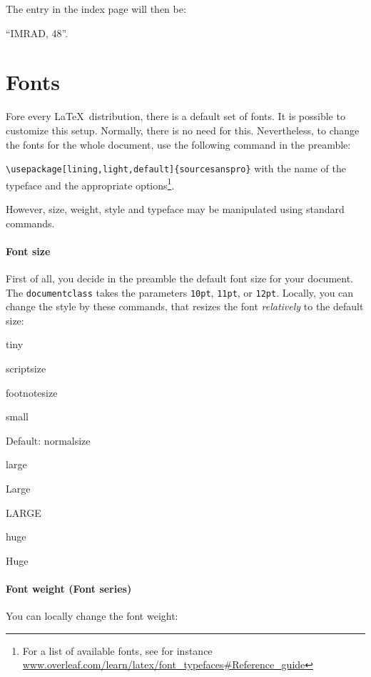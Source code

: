 The entry in the index page will then be:  

``IMRAD, 48''.

\section{Fonts}

Fore every  \LaTeX\ distribution, there is a default set of fonts.
It is possible to customize this  setup.
Normally, there is no need for this.
Nevertheless, to change the fonts for the whole document, use the following command in the preamble:

\verb|\usepackage[lining,light,default]{sourcesanspro}|
with the name of the typeface and the appropriate options\footnote{For a list of available fonts, see for instance \url{www.overleaf.com/learn/latex/font_typefaces\#Reference_guide}}.

However, size, weight, style and typeface may be manipulated using standard commands.

\paragraph{Font size}

First of all, you decide in the preamble the default font size for your document. The \texttt{documentclass} takes the parameters \texttt{10pt},  \texttt{11pt},  or \texttt{12pt}. Locally, you can change the style by these commands, that resizes the font {\em relatively} to the default size:

    \tiny tiny
    
    \scriptsize scriptsize
    
    \footnotesize footnotesize
    
    \small small
    
    \normalsize Default: normalsize
    
    \large  large
    
    \Large Large
    
    \LARGE LARGE
    
    \huge huge
    
    \Huge  Huge
    
    \normalsize 
    
\paragraph{Font weight (Font series)}
You can locally change the font weight:
    
